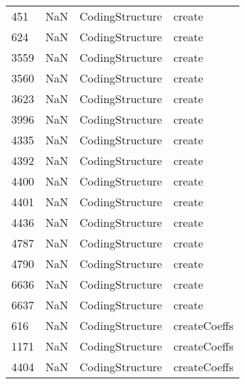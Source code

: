 \begin{tabular}{llll}
451  &                   NaN &            CodingStructure &                                    create \\
624  &                   NaN &            CodingStructure &                                    create \\
3559 &                   NaN &            CodingStructure &                                    create \\
3560 &                   NaN &            CodingStructure &                                    create \\
3623 &                   NaN &            CodingStructure &                                    create \\
3996 &                   NaN &            CodingStructure &                                    create \\
4335 &                   NaN &            CodingStructure &                                    create \\
4392 &                   NaN &            CodingStructure &                                    create \\
4400 &                   NaN &            CodingStructure &                                    create \\
4401 &                   NaN &            CodingStructure &                                    create \\
4436 &                   NaN &            CodingStructure &                                    create \\
4787 &                   NaN &            CodingStructure &                                    create \\
4790 &                   NaN &            CodingStructure &                                    create \\
6636 &                   NaN &            CodingStructure &                                    create \\
6637 &                   NaN &            CodingStructure &                                    create \\
616  &                   NaN &            CodingStructure &                              createCoeffs \\
1171 &                   NaN &            CodingStructure &                              createCoeffs \\
4404 &                   NaN &            CodingStructure &                              createCoeffs \\

\end{tabular}
